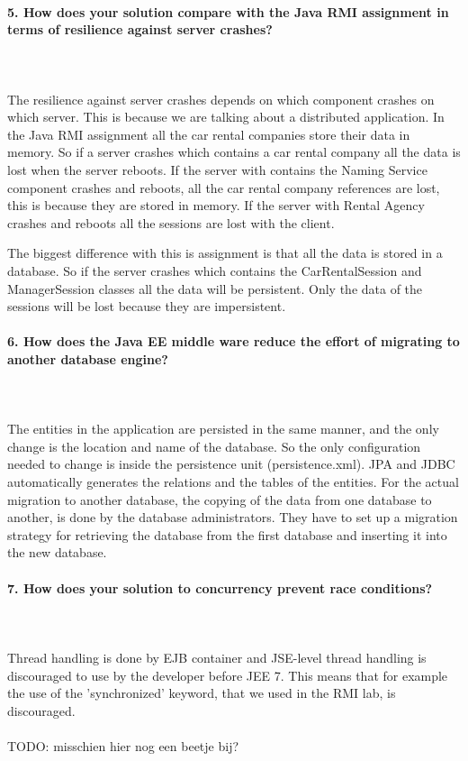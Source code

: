 \documentclass{ds-report}
\begin{document}
	\paragraph{5. How does your solution compare with the Java RMI assignment in terms of resilience against server crashes?} \mbox{}\\\\
The resilience against server crashes depends on which component crashes on which server. This is because we are talking about a distributed application. In the Java RMI assignment all the car rental companies store their data in memory. So if a server crashes which contains a car rental company all the data is lost when the server reboots. If the server with contains the Naming Service component crashes and reboots, all the car rental company references are lost, this is because they are stored in memory. If the server with Rental Agency crashes and reboots all the sessions are lost with the client.

The biggest difference with this is assignment is that all the data is stored in a database. So if the server crashes which contains the CarRentalSession and ManagerSession classes all the data will be persistent. Only the data of the sessions will be lost because they are impersistent.


		\paragraph{6. How does the Java EE middle ware reduce the effort of migrating to another database engine?} \mbox{}\\\\
The entities in the application are persisted in the same manner, and the only change is the location and name of the database. So the only configuration needed to change is inside the persistence unit (persistence.xml). JPA and JDBC automatically generates the relations and the tables of the entities.  
For the actual migration to another database, the copying of the data from one database to another, is done by the database administrators. They have to set up a migration strategy for retrieving the database from the first database and inserting it into the new database. 

 

	\paragraph{7. How does your solution to concurrency prevent race conditions?} \mbox{}\\\\
Thread handling is done by EJB container and JSE-level thread handling is discouraged to use by the developer before JEE 7. This means that for example the use of the 'synchronized' keyword, that we used in the RMI lab, is discouraged.\mbox{}\\\\
TODO: misschien hier nog een beetje bij?
\end{document}
